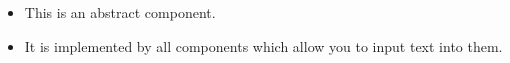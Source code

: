 \begin{itemize}
\item This is an abstract component.
\item It is implemented by all components which allow you to input text into them. 
\end{itemize}
